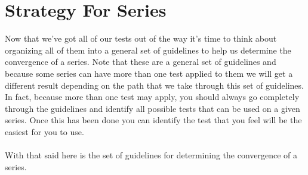 \documentclass[10pt,reqno]{book}
\theoremstyle{definition}
\begin{document}
	\section{Strategy For Series}
	
	Now that we've got all of our tests out of the way it's time to think about organizing all of them into a general set of guidelines to help us determine the convergence of a series. Note that these are a general set of guidelines and because some series can have more than one test applied to them we will get a different result depending on the path that we take through this set of guidelines. In fact, because more than one test may apply, you should always go completely through the guidelines and identify all possible tests that can be used on a given series. Once this has been done you can identify the test that you feel will be the easiest for you to use.\\ \\
	With that said here is the set of guidelines for determining the convergence of a series.
\end{document}
